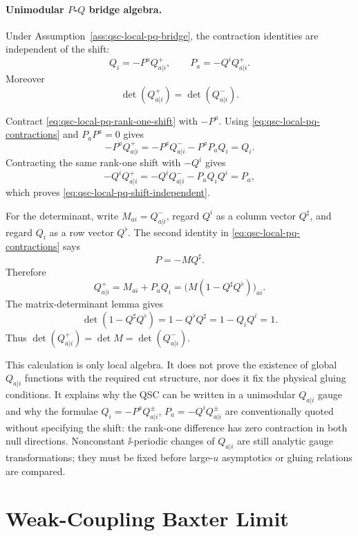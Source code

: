 \paragraph{Unimodular \(P\)-\(Q\) bridge algebra.}
Under Assumption~\ref{ass:qsc-local-pq-bridge}, the contraction identities are
independent of the shift:
\begin{equation}
  Q_i=-P^a Q_{a|i}^+,\qquad
  P_a=-Q^i Q_{a|i}^+ .
  \label{eq:qsc-local-pq-shift-independent}
\end{equation}
Moreover
\begin{equation}
  \det(Q_{a|i}^+)=\det(Q_{a|i}^-).
  \label{eq:qsc-local-pq-determinant-preserved}
\end{equation}

Contract \eqref{eq:qsc-local-pq-rank-one-shift} with \(-P^a\).  Using
\eqref{eq:qsc-local-pq-contractions} and \(P_aP^a=0\) gives
\[
  -P^aQ_{a|i}^+
  =
  -P^aQ_{a|i}^- - P^aP_a Q_i
  =
  Q_i .
\]
Contracting the same rank-one shift with \(-Q^i\) gives
\[
  -Q^iQ_{a|i}^+
  =
  -Q^iQ_{a|i}^- - P_a Q_iQ^i
  =
  P_a ,
\]
which proves \eqref{eq:qsc-local-pq-shift-independent}.

For the determinant, write \(M_{a i}=Q_{a|i}^-\), regard \(Q^i\) as a column
vector \(Q^\sharp\), and regard \(Q_i\) as a row vector \(Q^\flat\).  The
second identity in \eqref{eq:qsc-local-pq-contractions} says
\[
  P=-M Q^\sharp .
\]
Therefore
\[
  Q_{a|i}^+
  =
  M_{a i}+P_aQ_i
  =
  \bigl(M(1-Q^\sharp Q^\flat)\bigr)_{a i}.
\]
The matrix-determinant lemma gives
\[
  \det(1-Q^\sharp Q^\flat)
  =
  1-Q^\flat Q^\sharp
  =
  1-Q_iQ^i
  =
  1.
\]
Thus \(\det(Q_{a|i}^+)=\det M=\det(Q_{a|i}^-)\).

This calculation is only local algebra.  It does not prove the existence of
global \(Q_{a|i}\) functions with the required cut structure, nor does it fix
the physical gluing conditions.  It explains why the QSC can be written in a
unimodular \(Q_{a|i}\) gauge and why the formulae
\(Q_i=-P^aQ_{a|i}^{\pm}\), \(P_a=-Q^iQ_{a|i}^{\pm}\) are conventionally quoted
without specifying the shift: the rank-one difference has zero contraction in
both null directions.  Nonconstant \(\ii\)-periodic changes of \(Q_{a|i}\)
are still analytic gauge transformations; they must be fixed before large-\(u\)
asymptotics or gluing relations are compared.

\section{Weak-Coupling Baxter Limit}

